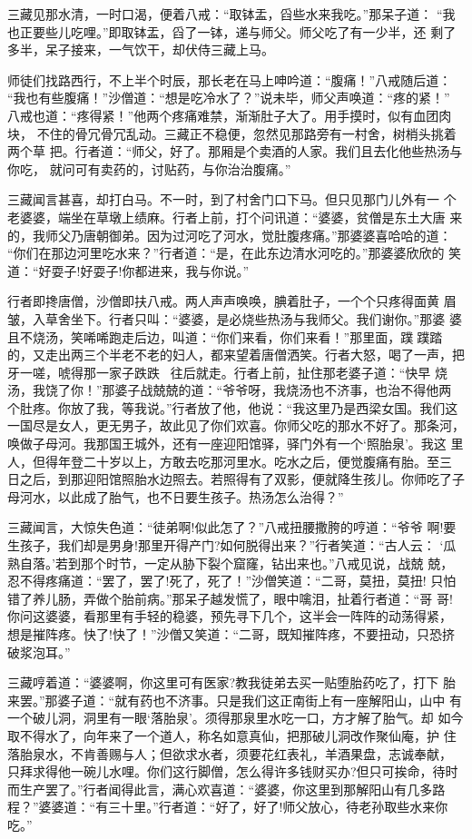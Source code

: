 三藏见那水清，一时口渴，便着八戒：“取钵盂，舀些水来我吃。”那呆子道：
“我也正要些儿吃哩。”即取钵盂，舀了一钵，递与师父。师父吃了有一少半，还
剩了多半，呆子接来，一气饮干，却伏侍三藏上马。

师徒们找路西行，不上半个时辰，那长老在马上呻吟道：“腹痛！”八戒随后道：
“我也有些腹痛！”沙僧道：“想是吃冷水了？”说未毕，师父声唤道：“疼的紧！”
八戒也道：“疼得紧！”他两个疼痛难禁，渐渐肚子大了。用手摸时，似有血团肉块，
不住的骨冗骨冗乱动。三藏正不稳便，忽然见那路旁有一村舍，树梢头挑着两个草
把。行者道：“师父，好了。那厢是个卖酒的人家。我们且去化他些热汤与你吃，
就问可有卖药的，讨贴药，与你治治腹痛。”

三藏闻言甚喜，却打白马。不一时，到了村舍门口下马。但只见那门儿外有一
个老婆婆，端坐在草墩上绩麻。行者上前，打个问讯道：“婆婆，贫僧是东土大唐
来的，我师父乃唐朝御弟。因为过河吃了河水，觉肚腹疼痛。”那婆婆喜哈哈的道：
“你们在那边河里吃水来？”行者道：“是，在此东边清水河吃的。”那婆婆欣欣的
笑道：“好耍子!好耍子!你都进来，我与你说。”

行者即搀唐僧，沙僧即扶八戒。两人声声唤唤，腆着肚子，一个个只疼得面黄
眉皱，入草舍坐下。行者只叫：“婆婆，是必烧些热汤与我师父。我们谢你。”那婆
婆且不烧汤，笑唏唏跑走后边，叫道：“你们来看，你们来看！”那里面，蹼蹼踏
的，又走出两三个半老不老的妇人，都来望着唐僧洒笑。行者大怒，喝了一声，把
牙一嗟，唬得那一家子跌跌，往后就走。行者上前，扯住那老婆子道：“快早
烧汤，我饶了你！”那婆子战兢兢的道：“爷爷呀，我烧汤也不济事，也治不得他两
个肚疼。你放了我，等我说。”行者放了他，他说：“我这里乃是西梁女国。我们这
一国尽是女人，更无男子，故此见了你们欢喜。你师父吃的那水不好了。那条河，
唤做子母河。我那国王城外，还有一座迎阳馆驿，驿门外有一个‘照胎泉’。我这
里人，但得年登二十岁以上，方敢去吃那河里水。吃水之后，便觉腹痛有胎。至三
日之后，到那迎阳馆照胎水边照去。若照得有了双影，便就降生孩儿。你师吃了子
母河水，以此成了胎气，也不日要生孩子。热汤怎么治得？”

三藏闻言，大惊失色道：“徒弟啊!似此怎了？”八戒扭腰撒胯的哼道：“爷爷
啊!要生孩子，我们却是男身!那里开得产门?如何脱得出来？”行者笑道：“古人云：
‘瓜熟自落。’若到那个时节，一定从胁下裂个窟窿，钻出来也。”八戒见说，战兢
兢，忍不得疼痛道：“罢了，罢了!死了，死了！”沙僧笑道：“二哥，莫扭，莫扭!
只怕错了养儿肠，弄做个胎前病。”那呆子越发慌了，眼中噙泪，扯着行者道：“哥
哥!你问这婆婆，看那里有手轻的稳婆，预先寻下几个，这半会一阵阵的动荡得紧，
想是摧阵疼。快了!快了！”沙僧又笑道：“二哥，既知摧阵疼，不要扭动，只恐挤
破浆泡耳。”

三藏哼着道：“婆婆啊，你这里可有医家?教我徒弟去买一贴堕胎药吃了，打下
胎来罢。”那婆子道：“就有药也不济事。只是我们这正南街上有一座解阳山，山中
有一个破儿洞，洞里有一眼‘落胎泉’。须得那泉里水吃一口，方才解了胎气。却
如今取不得水了，向年来了一个道人，称名如意真仙，把那破儿洞改作聚仙庵，护
住落胎泉水，不肯善赐与人；但欲求水者，须要花红表礼，羊酒果盘，志诚奉献，
只拜求得他一碗儿水哩。你们这行脚僧，怎么得许多钱财买办?但只可挨命，待时
而生产罢了。”行者闻得此言，满心欢喜道：“婆婆，你这里到那解阳山有几多路
程？”婆婆道：“有三十里。”行者道：“好了，好了!师父放心，待老孙取些水来你
吃。”

